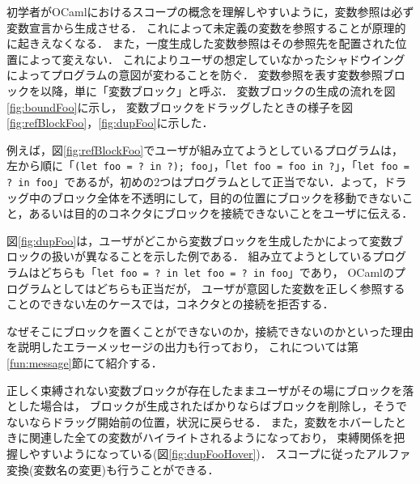 初学者がOCamlにおけるスコープの概念を理解しやすいように，変数参照は必ず変数宣言から生成させる．
これによって未定義の変数を参照することが原理的に起きえなくなる．
また，一度生成した変数参照はその参照先を配置された位置によって変えない．
これによりユーザの想定していなかったシャドウイングによってプログラムの意図が変わることを防ぐ．
変数参照を表す変数参照ブロックを以降，単に「変数ブロック」と呼ぶ．
変数ブロックの生成の流れを図\ref{fig:boundFoo}に示し，
変数ブロックをドラッグしたときの様子を図\ref{fig:refBlockFoo}，\ref{fig:dupFoo}に示した．

例えば，図\ref{fig:refBlockFoo}でユーザが組み立てようとしているプログラムは，左から順に「{\tt (let foo = ?\ in ?); foo}」，「{\tt let foo = foo in ?}」，「{\tt let foo = ?\ in foo}」であるが，初めの2つはプログラムとして正当でない．よって，ドラッグ中のブロック全体を不透明にして，目的の位置にブロックを移動できないこと，あるいは目的のコネクタにブロックを接続できないことをユーザに伝える．

図\ref{fig:dupFoo}は，ユーザがどこから変数ブロックを生成したかによって変数ブロックの扱いが異なることを示した例である．
組み立てようとしているプログラムはどちらも「{\tt let foo = ?\ in let foo = ?\ in foo}」であり，
OCamlのプログラムとしてはどちらも正当だが，
ユーザが意図した変数を正しく参照することのできない左のケースでは，コネクタとの接続を拒否する．

なぜそこにブロックを置くことができないのか，接続できないのかといった理由を説明したエラーメッセージの出力も行っており，
これについては第\ref{fun:message}節にて紹介する．

正しく束縛されない変数ブロックが存在したままユーザがその場にブロックを落とした場合は，
ブロックが生成されたばかりならばブロックを削除し，そうでないならドラッグ開始前の位置，状況に戻らせる．
また，変数をホバーしたときに関連した全ての変数がハイライトされるようになっており，
束縛関係を把握しやすいようになっている(図\ref{fig:dupFooHover})．
スコープに従ったアルファ変換(変数名の変更)も行うことができる．

